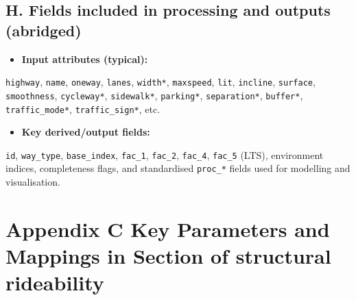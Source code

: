 \documentclass[
  12pt,
  oneside]{book}
\providecommand{\tightlist}{%
  \setlength{\itemsep}{0pt}\setlength{\parskip}{0pt}}
\begin{document}
\subsection*{H. Fields included in processing and outputs (abridged)}\label{h.-fields-included-in-processing-and-outputs-abridged}

\begin{itemize}
\tightlist
\item
  \textbf{Input attributes (typical):}
\end{itemize}

\texttt{highway}, \texttt{name}, \texttt{oneway}, \texttt{lanes}, \texttt{width*}, \texttt{maxspeed}, \texttt{lit}, \texttt{incline}, \texttt{surface}, \texttt{smoothness}, \texttt{cycleway*}, \texttt{sidewalk*}, \texttt{parking*}, \texttt{separation*}, \texttt{buffer*}, \texttt{traffic\_mode*}, \texttt{traffic\_sign*}, etc.

\begin{itemize}
\tightlist
\item
  \textbf{Key derived/output fields:}
\end{itemize}

\texttt{id}, \texttt{way\_type}, \texttt{base\_index}, \texttt{fac\_1}, \texttt{fac\_2}, \texttt{fac\_4}, \texttt{fac\_5} (LTS), environment indices, completeness flags, and standardised \texttt{proc\_*} fields used for modelling and visualisation.

\clearpage

\section*{Appendix C Key Parameters and Mappings in Section of structural rideability}\label{sec:appendix-params}

\begingroup\fontsize{9}{11}\selectfont
\end{document}

